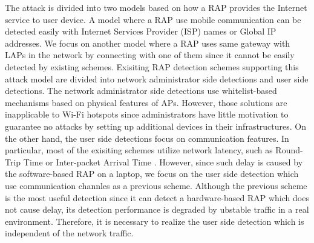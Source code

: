 \documentclass[conference]{IEEEtran}
\begin{document}
The attack is divided into two models based on how a RAP provides the Internet service to user device.
A model where a RAP use mobile communication can be detected easily with Internet Services Provider (ISP) names or Global IP addresses\cite{rtt}.
We focus on another model where a RAP uses same gateway with LAPs in the network by connecting with one of them since it cannot be easily detected by existing schemes.
Exisiting RAP detection schemes supporting this attack model are divided into network administrator side detections and user side detections.
The network administrator side detections use whitelist-based mechanisms based on physical features of APs\cite{prapd}\cite{clockskew}.
However, those solutions are inapplicable to Wi-Fi hotspots since administrators have little motivation to guarantee no attacks by setting up additional devices in their infrastructures.
On the other hand, the user side detections focus on communication features.
In particular, most of the exisiting schemes utilize network latency, such as Round-Trip Time or Inter-packet Arrival Time \cite{rtt}\cite{iat}.
However, since such delay is caused by the software-based RAP on a laptop, we focus on the user side detection which use communication channles as a previous scheme\cite{previous}.
Although the previous scheme is the most useful detection since it can detect a hardware-based RAP which does not cause delay, its detection performance is degraded by ubstable traffic in a real environment.
Therefore, it is necessary to realize the user side detection which is independent of the network traffic.
\end{document}
